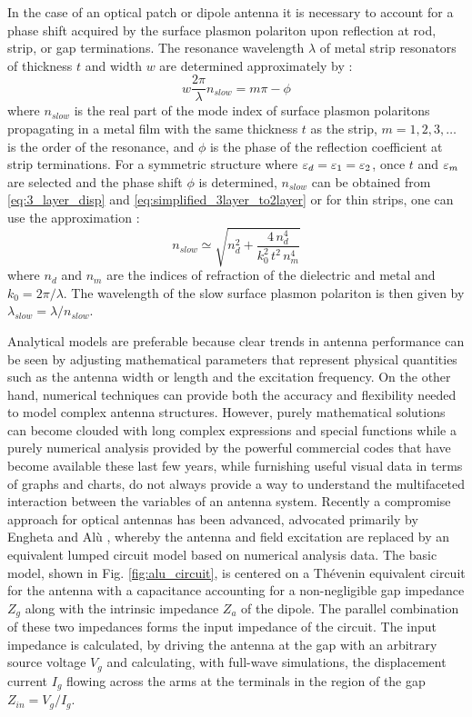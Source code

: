 \documentclass[11pt]{article}
\begin{document}
In the case of an optical patch or dipole antenna it is necessary to account for a phase shift acquired by the surface plasmon polariton upon reflection at rod, strip, or gap terminations. The resonance wavelength $\lambda$ of metal strip resonators of thickness $t$ and width $w$ are determined approximately by \cite{Sondergaard2007}:
%
\begin{equation}
  w \frac{2 \pi}{\lambda} n_{slow} = m\pi  - \phi
  \label{eq:resonant_lambda}
\end{equation}
%
where $n_{slow}$ is the real part of the mode index of surface plasmon polaritons propagating in a metal film with the same thickness $t$ as the strip, $m = 1,2,3,\dotsc $ is the order of the resonance, and $\phi$ is the phase of the reflection coefficient at strip terminations. For a symmetric structure where $\varepsilon_d = \varepsilon_1 = \varepsilon_2$, once $t$ and $\varepsilon_m$ are selected and the phase shift $\phi$ is determined, $n_{slow}$ can be obtained from \eqref{eq:3_layer_disp} and \eqref{eq:simplified_3layer_to2layer} or for thin strips, one can use the approximation \cite{Sondergaard2008}:
%
\begin{equation}
  n_{slow} \simeq \sqrt {n_d^2 + \frac{4 \, n_d^4}{k_0^2 \, t^2 \, n_m^4}}
  \label{eq:n_approx}
\end{equation}
%
where $n_d$ and $n_m$ are the indices of refraction of the dielectric and metal and $k_0 = 2 \pi /\lambda$. The wavelength of the slow surface plasmon polariton is then given by $\lambda_{slow} = \lambda/ n_{slow}$.

Analytical models are preferable because clear trends in antenna performance can be seen by adjusting mathematical parameters that represent physical quantities such as the antenna width or length and the excitation frequency. On the other hand, numerical techniques can provide both the accuracy and flexibility needed to model complex antenna structures. However, purely mathematical solutions can become clouded with long complex expressions and special functions while a purely numerical analysis provided by the powerful commercial codes that have become available these last few years, while furnishing useful visual data in terms of graphs and charts, do not always provide a way to understand the multifaceted interaction between the variables of an antenna system. Recently a compromise approach for optical antennas has been advanced, advocated primarily by Engheta and Alù \cite{Engheta2005,Alu2007,Zhao2011,9781107014145}, whereby the antenna and field excitation are replaced by an equivalent lumped circuit model based on
numerical analysis data. The basic model, shown in Fig. \ref{fig:alu_circuit}, is centered on a Thévenin equivalent circuit for the antenna with a capacitance accounting for a non-negligible gap
impedance $Z_g$ along with the intrinsic impedance $Z_a$ of the dipole. The parallel combination of these two impedances forms the input impedance of the circuit. The input impedance is calculated, by driving the antenna at the gap with an arbitrary source voltage $V_g$ and calculating, with full-wave simulations, the displacement current $I_g$ flowing across the arms at the terminals in the region of the gap $Z_{in} = V_g / I_g$.
\end{document}
